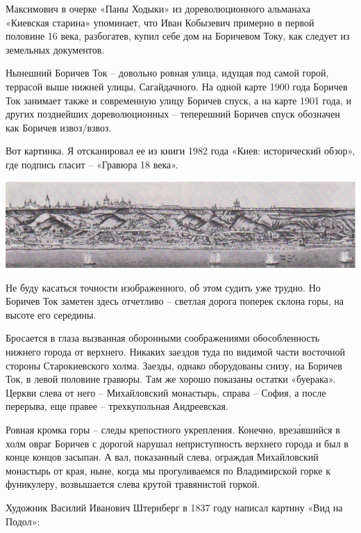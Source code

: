 Максимович в очерке «Паны Ходыки» из  дореволюционного альманаха «Киевская старина» упоминает, что Иван Кобызевич примерно в первой половине 16 века, разбогатев, купил себе дом на Боричевом Току, как следует из земельных документов.

Нынешний Боричев Ток – довольно ровная улица, идущая под самой горой, террасой выше нижней улицы, Сагайдачного. На одной карте 1900 года Боричев Ток занимает также и современную улицу Боричев спуск, а на карте 1901 года, и других позднейших дореволюционных – теперешний Боричев спуск обозначен как Боричев извоз/взвоз.

Вот картинка. Я отсканировал ее из книги 1982 года «Киев: исторический обзор», где подпись гласит – «Гравюра 18 века».

\begin{center}
\includegraphics[width=\linewidth]{chast-colebanie-osnov/borichev-tok/18-vek-bor.jpg}
\end{center}

Не буду касаться точности изображенного, об этом судить уже трудно. Но Боричев Ток заметен здесь отчетливо – светлая дорога поперек склона горы, на высоте его середины.

Бросается в глаза вызванная оборонными соображениями обособленность нижнего города от верхнего. Никаких заездов туда по видимой части восточной стороны Старокиевского холма. Заезды, однако оборудованы снизу, на Боричев Ток, в левой половине гравюры. Там же хорошо показаны остатки «буерака». Церкви слева от него – Михайловский монастырь, справа – София, а после перерыва, еще правее – трехкупольная Андреевская.

Ровная кромка горы – следы крепостного укрепления. Конечно, врез\'авшийся в холм овраг Боричев с дорогой нарушал неприступность верхнего города и был в конце концов засыпан. А вал, показанный слева, ограждая Михайловский монастырь от края, ныне, когда мы прогуливаемся по Владимирской горке к фуникулеру, возвышается слева крутой травянистой горкой.

Художник Василий Иванович Штернберг в 1837 году написал картину «Вид на Подол»:

